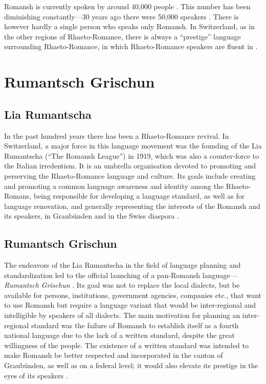 Romansh is currently spoken by around 40,000 people \autocite{bundesamt2020}. 
This number has been diminishing constantly---30 years ago there were 50,000 speakers \autocite{haiman1992}. 
There is however hardly a single person who speaks only Romansh. 
In Switzerland, as in the other regions of Rhaeto-Romance, there is always a \enquote{prestige} language surrounding Rhaeto-Romance, in which Rhaeto-Romance speakers are fluent in \autocite[3]{haiman1992}. 

\section{Rumantsch Grischun}
\subsection{Lia Rumantscha}
In the past hundred years there has been a Rhaeto-Romance revival. 
In Switzerland, a major force in this language movement was the founding of the Lia Rumantscha (\enquote{The Romansh League}) in 1919, which was also a counter-force to the Italian irredentism\footnotemark[\value{footnote}]. 
It is an umbrella organisation devoted to promoting and perserving the Rhaeto-Romance language and culture. Its goals include creating and promoting a common language awareness and identity among the Rhaeto-Romans, being responsible for developing a language standard, as well as for language renovation, and generally representing the interests of the Romansh and its speakers, in Graubünden and in the Swiss diaspora \autocite{dazzi2012}.

\subsection{Rumantsch Grischun}
The endeavors of the Lia Rumantscha in the field of language planning and standardization led to the official launching of a pan-Romansh language---\emph{Rumantsch Grischun} \autocite[5]{haiman1992}. 
Its goal was not to replace the local dialects, but be available for persons, institutions, government agencies, companies etc., that want to use Romansh but require a language variant that would be inter-regional and intelligible by speakers of all dialects. The main motivation for planning an inter-regional standard was the failure of Romansh to establish itself as a fourth national language due to the lack of a written standard, despite the great willingness of the people.
The existence of a written standard was intended to make Romansh be better respected and incorporated in the canton of Graubünden, as well as on a federal level; 
it would also elevate its prestige in the eyes of its speakers \autocite{schmid1982}.

